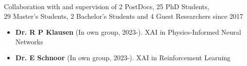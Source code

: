 
\newcommand{\supervision}[3]{\textbf{#1} (In own group, #2). {\small #3}}
\newcommand{\cosupervision}[4]{\textbf{#1} (#2, #3, co-supervision). {\small #4}}

\ifdefined\shortcv
    {
        \hspace*{\fill} Collaboration with and supervision of 2 PostDocs, 25 PhD Students,\\
        \hspace*{\fill} 29 Master's Students, 2 Bachelor's Students and 4 Guest Researchers since 2017
        }
\else
        {
            \begin{itemize}
                \item [] \supervision{Dr. R P Klausen}{2023-}{XAI in Physics-Informed Neural Networks}
                \item [] \supervision{Dr. E Schnoor}{2023-}{XAI in Reinforcement Learning}
            \end{itemize}
        }

